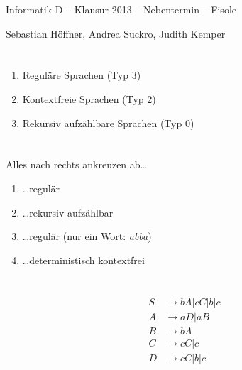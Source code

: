 \documentclass{article}
\begin{document}
\begin{center}
  \Large{Informatik D -- Klausur 2013 -- Nebentermin -- Fisole}

  \large{Sebastian Höffner, Andrea Suckro, Judith Kemper}
\end{center}

\section{}
\begin{enumerate}
	\item Reguläre Sprachen (Typ 3)
	\item Kontextfreie Sprachen (Typ 2)
	\item Rekursiv aufzählbare Sprachen (Typ 0)
\end{enumerate}


\section{}
Alles nach rechts ankreuzen ab\dots
\begin{enumerate}
	\item \dots regulär
  \item \dots rekursiv aufzählbar
  \item \dots regulär (nur ein Wort: \emph{abba})
  \item \dots deterministisch kontextfrei
\end{enumerate}

\section{}
\begin{align*}
S &\rightarrow bA | cC | b | c\\
A &\rightarrow aD | aB\\
B &\rightarrow bA\\
C &\rightarrow cC | c\\
D &\rightarrow cC | b | c
\end{align*}
\end{document}
